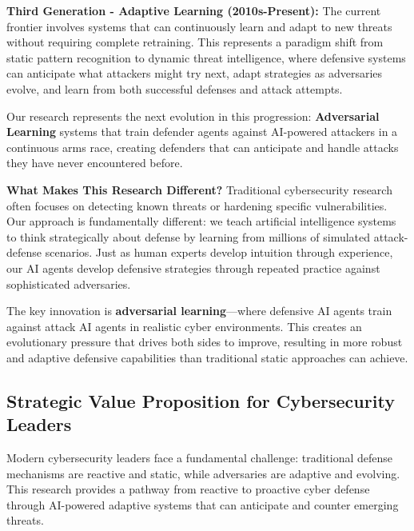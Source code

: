 \documentclass[12pt,twoside]{article}
\theoremstyle{definition}
\theoremstyle{plain}
\begin{document}
\textbf{Third Generation - Adaptive Learning (2010s-Present):} The current frontier involves systems that can continuously learn and adapt to new threats without requiring complete retraining. This represents a paradigm shift from static pattern recognition to dynamic threat intelligence, where defensive systems can anticipate what attackers might try next, adapt strategies as adversaries evolve, and learn from both successful defenses and attack attempts.

Our research represents the next evolution in this progression: \textbf{Adversarial Learning} systems that train defender agents against AI-powered attackers in a continuous arms race, creating defenders that can anticipate and handle attacks they have never encountered before.

\textbf{What Makes This Research Different?}
Traditional cybersecurity research often focuses on detecting known threats or hardening specific vulnerabilities. Our approach is fundamentally different: we teach artificial intelligence systems to think strategically about defense by learning from millions of simulated attack-defense scenarios. Just as human experts develop intuition through experience, our AI agents develop defensive strategies through repeated practice against sophisticated adversaries.

The key innovation is \textbf{adversarial learning}—where defensive AI agents train against attack AI agents in realistic cyber environments. This creates an evolutionary pressure that drives both sides to improve, resulting in more robust and adaptive defensive capabilities than traditional static approaches can achieve.

\subsection{Strategic Value Proposition for Cybersecurity Leaders}

Modern cybersecurity leaders face a fundamental challenge: traditional defense mechanisms are reactive and static, while adversaries are adaptive and evolving. This research provides a pathway from reactive to proactive cyber defense through AI-powered adaptive systems that can anticipate and counter emerging threats.
\end{document}
